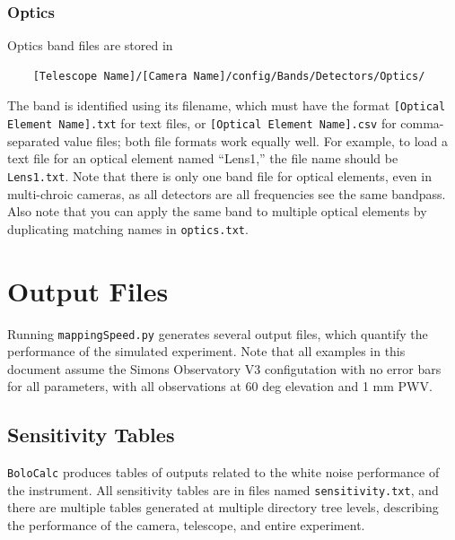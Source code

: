\documentclass[11pt]{article} %
\begin{document}

\subsubsection{Optics}

Optics band files are stored in

\begin{lstlisting}
	[Telescope Name]/[Camera Name]/config/Bands/Detectors/Optics/
\end{lstlisting}

The band is identified using its filename, which must have the format \texttt{[Optical Element Name].txt} for text files, or \texttt{[Optical Element Name].csv} for comma-separated value files; both file formats work equally well. For example, to load a text file for an optical element named ``Lens1,'' the file name should be \texttt{Lens1.txt}. Note that there is only one band file for optical elements, even in multi-chroic cameras, as all detectors are all frequencies see the same bandpass. Also note that you can apply the same band to multiple optical elements by duplicating matching names in \texttt{optics.txt}.


\section{Output Files}

Running \texttt{mappingSpeed.py} generates several output files, which quantify the performance of the simulated experiment. Note that all examples in this document assume the Simons Observatory V3 configutation with no error bars for all parameters, with all observations at 60 deg elevation and 1 mm PWV.


\subsection{Sensitivity Tables}

\texttt{BoloCalc} produces tables of outputs related to the white noise performance of the instrument. All sensitivity tables are in files named \texttt{sensitivity.txt}, and there are multiple tables generated at multiple directory tree levels, describing the performance of the camera, telescope, and entire experiment.

\end{document}
